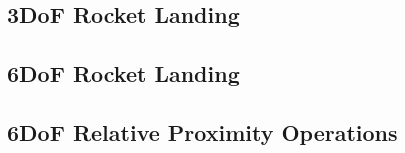 \documentclass[../main.tex]{subfiles}
\begin{document}
\subsection{3DoF Rocket Landing}

\subsection{6DoF Rocket Landing}

\subsection{6DoF Relative Proximity Operations}
\end{document}

